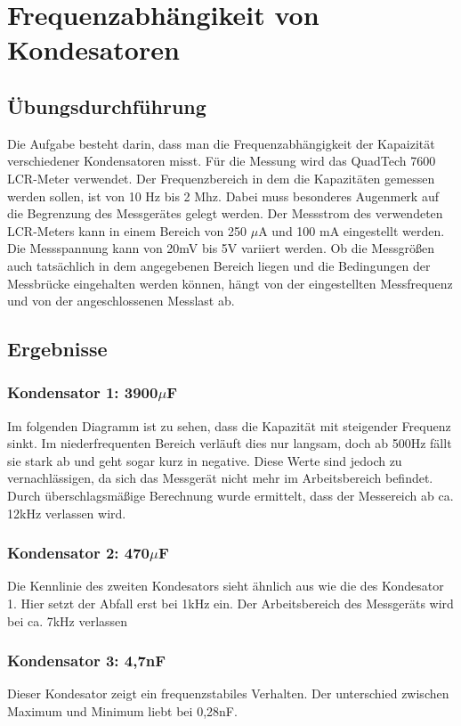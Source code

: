 \documentclass[a4paper,twoside,12pt,DIV=13,BCOR=5mm,numbers=noenddot,cleardoublepage=empty]{scrbook}
\begin{document}
    \section{Frequenzabh\"angikeit von Kondesatoren}
    \subsection{\"Ubungsdurchf\"uhrung}
    Die Aufgabe besteht darin, dass man die Frequenzabh\"angigkeit der Kapaizit\"at verschiedener Kondensatoren misst.
    F\"ur die Messung wird das QuadTech 7600 LCR-Meter verwendet. Der 
    Frequenzbereich in dem die Kapazit\"aten gemessen werden sollen, 
    ist von 10 Hz bis 2 Mhz. Dabei muss besonderes Augenmerk auf die 
    Begrenzung des Messger\"ates gelegt werden. Der Messstrom des verwendeten 
    LCR-Meters kann in einem Bereich von 250 $\mu$A und 100 mA eingestellt 
    werden. Die Messspannung kann von 20mV bis 5V variiert werden. Ob die 
    Messgr\"o\ss{}en auch tats\"achlich in dem angegebenen Bereich liegen und die 
    Bedingungen der Messbr\"ucke eingehalten werden k\"onnen, h\"angt von der
    eingestellten Messfrequenz und von der angeschlossenen Messlast ab.
    
    \subsection{Ergebnisse}
    \subsubsection{Kondensator 1: 3900$\mu$F }
    Im folgenden Diagramm ist zu sehen, dass die Kapazit\"at mit steigender Frequenz sinkt. Im 
    niederfrequenten Bereich verl\"auft dies nur langsam, doch ab 500Hz f\"allt sie stark ab und geht 
    sogar kurz in negative. Diese Werte sind jedoch zu vernachl\"assigen, da sich das Messger\"at nicht mehr 
    im Arbeitsbereich befindet. Durch \"uberschlagsm\"a\ss{}ige Berechnung wurde ermittelt, dass der Messereich ab 
    ca. 12kHz verlassen wird.
    \subsubsection{Kondensator 2: 470$\mu$F }
    Die Kennlinie des zweiten Kondesators sieht \"ahnlich aus wie die des Kondesator 1. Hier setzt der Abfall 
    erst bei 1kHz ein. Der Arbeitsbereich des Messger\"ats wird bei ca. 7kHz verlassen
    \subsubsection{Kondensator 3: 4,7nF }
    Dieser Kondesator zeigt ein frequenzstabiles Verhalten. Der unterschied zwischen Maximum und Minimum liebt 
    bei 0,28nF.
\end{document}
